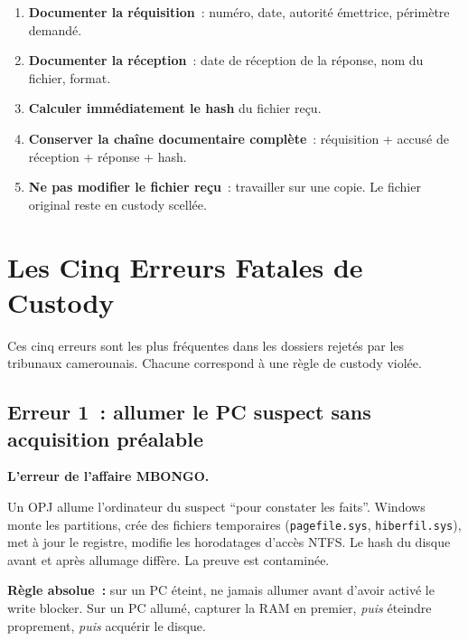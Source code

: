 \begin{enumerate}
    \item \textbf{Documenter la réquisition}~: numéro, date, autorité
          émettrice, périmètre demandé.
    \item \textbf{Documenter la réception}~: date de réception de la
          réponse, nom du fichier, format.
    \item \textbf{Calculer immédiatement le hash} du fichier reçu.
    \item \textbf{Conserver la chaîne documentaire complète}~:
          réquisition + accusé de réception + réponse + hash.
    \item \textbf{Ne pas modifier le fichier reçu}~: travailler sur une
          copie. Le fichier original reste en custody scellée.
\end{enumerate}

\section{Les Cinq Erreurs Fatales de Custody}
\label{sec:custody-erreurs}

Ces cinq erreurs sont les plus fréquentes dans les dossiers rejetés par les
tribunaux camerounais. Chacune correspond à une règle de custody violée.

\subsection{Erreur 1~: allumer le PC suspect sans acquisition préalable}

\begin{boxalert}
\textbf{L'erreur de l'affaire MBONGO.}

Un OPJ allume l'ordinateur du suspect ``pour constater les faits''. Windows
monte les partitions, crée des fichiers temporaires (\texttt{pagefile.sys},
\texttt{hiberfil.sys}), met à jour le registre, modifie les horodatages d'accès
NTFS. Le hash du disque avant et après allumage diffère. La preuve est
contaminée.

\textbf{Règle absolue~:} sur un PC éteint, ne jamais allumer avant d'avoir
activé le write blocker. Sur un PC allumé, capturer la RAM en premier,
\emph{puis} éteindre proprement, \emph{puis} acquérir le disque.
\end{boxalert}

